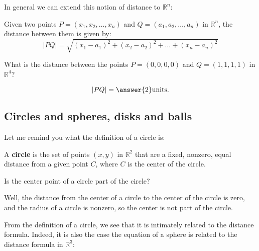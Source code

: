 \documentclass{ximera}
\begin{document}
In general we can extend this notion of distance to $\mathbb{R}^n$:

\begin{theorem}
  Given two points $P=(x_1,x_2,\dots,x_n)$ and $Q=(a_1,a_2,\dots,a_n)$
  in $\mathbb{R}^n$, the distance between them is given by:
  \[
  |PQ|=\sqrt{(x_1-a_1)^2 + (x_2-a_2)^2 + \dots + (x_n-a_n)^2}
  \]
\end{theorem}

\begin{question}
  What is the distance between the points $P=(0,0,0,0)$ and $Q=(1,1,1,1)$ in $\mathbb{R}^4$?
  \begin{prompt}
    \[
    |PQ|=\answer{2}\mathrm{units}.
    \]
  \end{prompt}
\end{question}





\subsection{Circles and spheres, disks and balls}

Let me remind you what the definition of a circle is:
\begin{definition}
  A \textbf{circle} is the set of points $(x,y)$ in $\mathbb{R}^2$ that are a
  fixed, nonzero, equal distance from a given point $C$, where $C$ is
  the center of the circle.
\end{definition}

\begin{question}
  Is the center point of a circle part of the circle?
  \begin{prompt}
    \begin{multipleChoice}
    \end{multipleChoice}
    \begin{feedback}
      Well, the distance from the center of a circle to the center of
      the circle is zero, and the radius of a circle is nonzero, so
      the center is not part of the circle.
    \end{feedback}
  \end{prompt}
\end{question}

From the definition of a circle, we see that it is intimately related
to the distance formula. Indeed, it is also the case the equation of a
sphere is related to the distance formula in $\mathbb{R}^3$:
\end{document}
